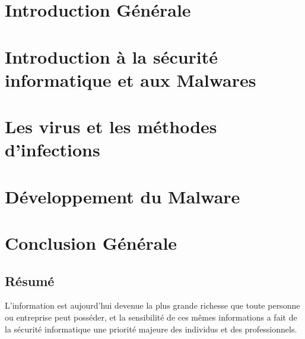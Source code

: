 \documentclass[12pt]{report}
\begin{document}


\renewcommand{\contentsname}{Sommaire}
\tableofcontents
\listoffigures
\listoftables

\chapter*{Introduction Générale}



\chapter{Introduction à la sécurité informatique et aux Malwares}


\chapter{Les virus et les méthodes d'infections}


\chapter{Développement du Malware}


\chapter*{Conclusion Générale}


\appendix




\clearpage

\pagestyle{empty}

\section*{Résumé} 
L’information est aujourd’hui devenue la plus grande richesse que toute personne ou entreprise peut posséder, et la sensibilité de ces mêmes informations a fait de la sécurité informatique une priorité majeure des individus et des professionnels.
\end{document}

